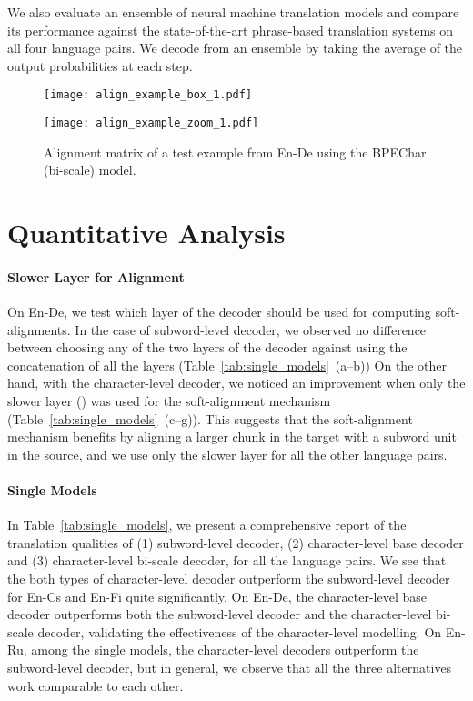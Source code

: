 \documentclass[11pt]{article}
\begin{document}
We also evaluate an ensemble of neural machine translation models and compare
its performance against the state-of-the-art phrase-based translation systems on
all four language pairs. We decode from an ensemble by taking the
average of the output probabilities at each step.

\begin{figure*}[ht]
    \begin{minipage}{0.6\textwidth}
        \centering
        \texttt{[image: align\_example\_box\_1.pdf]}
    \end{minipage}
    \begin{minipage}{0.3\textwidth}
        \texttt{[image: align\_example\_zoom\_1.pdf]}
    \end{minipage}
    \hfill
    \caption{Alignment matrix of a test example from En-De
             using the BPEChar (bi-scale) model.}
    \label{fig:align}

\end{figure*}


\section{Quantitative Analysis}

\paragraph{Slower Layer for Alignment}
On En-De, we test which layer of the decoder should be used for computing
soft-alignments. In the case of subword-level decoder, we observed no
difference between choosing any of the two layers of the decoder against using
the concatenation of all the layers (Table~\ref{tab:single_models}~(a--b)) On
the other hand, with the character-level decoder, we noticed an improvement when
only the slower layer () was used for the soft-alignment mechanism
(Table~\ref{tab:single_models}~(c--g)).  This suggests that the soft-alignment
mechanism benefits by aligning a larger chunk in the target with a subword unit
in the source, and we use only the slower layer for all the other language
pairs.

\paragraph{Single Models}
In Table~\ref{tab:single_models}, we present a comprehensive report of the
translation qualities of (1) subword-level decoder, (2) character-level base
decoder and (3) character-level bi-scale decoder, for all the language pairs. We
see that the both types of character-level decoder outperform the subword-level
decoder for En-Cs and En-Fi quite significantly. On En-De, the
character-level base decoder outperforms both the subword-level
decoder and the character-level bi-scale decoder, validating the
effectiveness of the character-level modelling.
On En-Ru, among the single models, the character-level decoders
outperform the subword-level decoder, but in general, we observe that all the three
alternatives work comparable to each other. 
\end{document}
